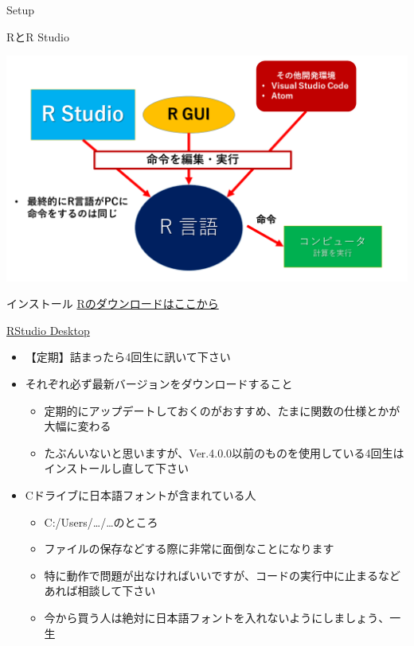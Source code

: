 \documentclass[
  ignorenonframetext,
]{beamer}
\providecommand{\tightlist}{%
  \setlength{\itemsep}{0pt}\setlength{\parskip}{0pt}}
\begin{document}
\begin{frame}[fragile]{Setup}
\begin{block}{RとR Studio}
\protect\hypertarget{rux3068r-studio}{}
\begin{center}\includegraphics[width=0.95\linewidth]{figs/r_structure} \end{center}
\end{block}

\begin{block}{インストール}
\protect\hypertarget{ux30a4ux30f3ux30b9ux30c8ux30fcux30eb}{}
\href{https://cran.ism.ac.jp/}{Rのダウンロードはここから}

\href{https://www.rstudio.com/products/rstudio/download/\#download}{RStudio
Desktop}

\begin{itemize}
\tightlist
\item
  【定期】詰まったら4回生に訊いて下さい
\item
  それぞれ必ず最新バージョンをダウンロードすること

  \begin{itemize}
  \tightlist
  \item
    定期的にアップデートしておくのがおすすめ、たまに関数の仕様とかが大幅に変わる
  \item
    たぶんいないと思いますが、Ver.4.0.0以前のものを使用している4回生はインストールし直して下さい
  \end{itemize}
\item
  Cドライブに日本語フォントが含まれている人

  \begin{itemize}
  \tightlist
  \item
    C:/Users/\ldots/\ldots のところ
  \item
    ファイルの保存などする際に非常に面倒なことになります
  \item
    特に動作で問題が出なければいいですが、コードの実行中に止まるなどあれば相談して下さい
  \item
    今から買う人は絶対に日本語フォントを入れないようにしましょう、一生
  \end{itemize}
\end{itemize}
\end{block}


\end{frame}
\end{document}
